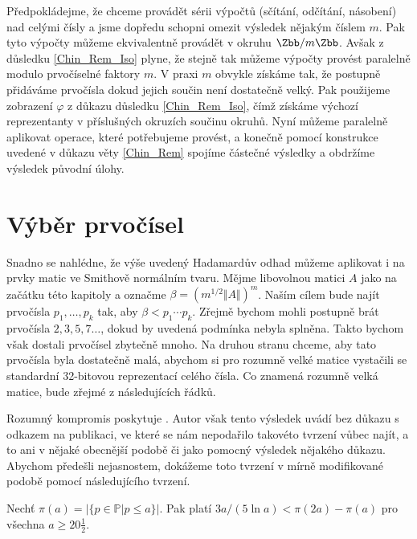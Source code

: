 Předpokládejme, že chceme provádět sérii výpočtů (sčítání, odčítání,
násobení) nad celými čísly a jsme dopředu schopni omezit výsledek nějakým číslem
$ m $. Pak tyto výpočty můžeme ekvivalentně provádět v okruhu $ \Zbb / m \Zbb $.
Avšak z důsledku \ref{Chin_Rem_Iso} plyne, že stejně tak můžeme výpočty provést
paralelně modulo prvočíselné faktory $ m $. V praxi $ m $ obvykle získáme tak,
že postupně přidáváme prvočísla dokud jejich součin není dostatečně velký.
Pak použijeme zobrazení $ \varphi $ z důkazu důsledku \ref{Chin_Rem_Iso},
čímž získáme výchozí reprezentanty v příslušných okruzích součinu okruhů.
Nyní můžeme paralelně aplikovat operace, které potřebujeme provést, a konečně
pomocí konstrukce uvedené v důkazu věty \ref{Chin_Rem} spojíme částečné výsledky
a obdržíme výsledek původní úlohy.


\section{Výběr prvočísel}
Snadno se nahlédne, že výše uvedený Hadamardův odhad můžeme aplikovat i na prvky
matic ve Smithově normálním tvaru. Mějme libovolnou matici $ A $ jako na začátku
této kapitoly a označme $ \beta = (m^{1/2} \Vert A \Vert )^m $. Naším cílem bude
najít prvočísla $ p_1,\dots, p_k $ tak, aby $ \beta < p_1 \cdots p_k $. Zřejmě
bychom mohli postupně brát prvočísla $ 2, 3, 5, 7 \dots $, dokud by uvedená
podmínka nebyla splněna. Takto bychom však dostali prvočísel zbytečně mnoho. Na
druhou stranu chceme, aby tato prvočísla byla dostatečně malá, abychom
si pro rozumně velké matice vystačili se standardní 32-bitovou reprezentací
celého čísla. Co znamená rozumně velká matice, bude zřejmé z následujících řádků.

Rozumný kompromis poskytuje \cite[Lemma 14]{triang}. Autor však tento výsledek
uvádí bez důkazu s odkazem na publikaci, ve které se nám nepodařilo takovéto
tvrzení vůbec najít, a to ani v nějaké obecnější podobě či jako pomocný výsledek
nějakého důkazu. Abychom předešli nejasnostem, dokážeme toto tvrzení v mírně
modifikované podobě pomocí následujícího tvrzení.


\begin{lem} \label{num_primes_src}
Nechť $ \pi(a) = \left\vert \{ p \in \mathbb{P} \vert p \leq a \} \right\vert $. Pak
platí $ 3a / (5 \ln{a}) < \pi(2a) - \pi(a) $ pro všechna $ a \geq 20 \frac{1}{2} $.
\end{lem}

